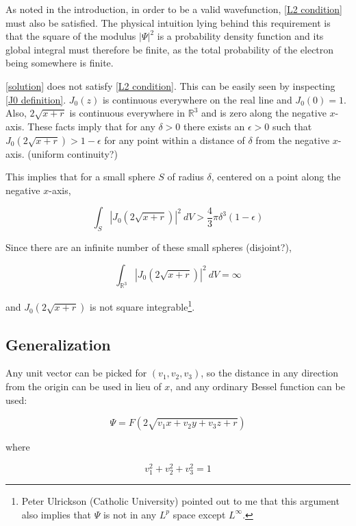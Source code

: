 \documentclass{article}
\begin{document}
As noted in the introduction, in order to be a valid wavefunction, \eqref{L2 condition} must also be satisfied.
The physical intuition lying behind this requirement is that the square of the modulus $|\Psi|^2$ is a probability
density function and its global integral must therefore be finite, as the total probability of the electron
being somewhere is finite. \cite[\S 1.4]{Griffiths}

\eqref{solution} does not satisfy \eqref{L2 condition}.  This can be easily seen by inspecting \eqref{J0 definition}.
$J_0(z)$ is continuous everywhere on the real line and $J_0(0)=1$.  Also, $2\sqrt{x+r}$ is continuous
everywhere in $\mathbb{R}^3$ and is zero along the negative $x$-axis.  These facts imply that for any
$\delta>0$ there exists an $\epsilon>0$ such that $J_0(2\sqrt{x+r}) > 1-\epsilon$ for any point within
a distance of $\delta$ from the negative $x$-axis. (uniform continuity?)

This implies that for a small sphere $S$ of radius $\delta$, centered on a point along the negative $x$-axis,

\[ \int_S \left|J_0(2\sqrt{x+r})\right|^2\  dV > \frac{4}{3}\pi\delta^3(1-\epsilon) \]

Since there are an infinite number of these small spheres (disjoint?),

\[ \int_{\mathbb{R}^3} \left|J_0(2\sqrt{x+r})\right|^2\ dV  = \infty \]

and $J_0(2\sqrt{x+r})$ is not square integrable\footnote{Peter Ulrickson (Catholic University) pointed out
to me that this argument also implies that $\Psi$ is not in any $L^p$ space except $L^\infty$.}.

\subsection*{Generalization}
\parskip 12pt

Any unit vector can be picked for $(v_1, v_2, v_3)$,
so the distance in any direction from the origin can be used in lieu of $x$,
and any ordinary Bessel function can be used:

\begin{equation}
\label{generalized solution}
\Psi = F(2\sqrt{v_1 x+ v_2 y+ v_3 z+r})
\end{equation}

where

\begin{equation*}
v_1^2+v_2^2+v_3^2=1
\end{equation*}
\end{document}
